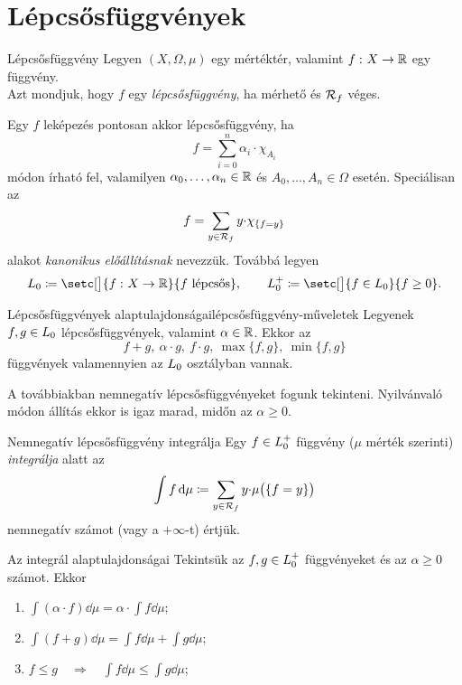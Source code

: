 \documentclass[
]{elteikthesis}[2024/04/26]
\begin{document}
	\newpage
	\section{Lépcsősfüggvények}
	
	\begin{definition}{Lépcsősfüggvény}{}
		Legyen \( (X, \Omega, \mu) \) egy mértéktér, 
		valamint \( f \,\colon X \to \mathbb{R} \) egy függvény.\\[3pt]
		Azt mondjuk, hogy \( f \) egy \emph{lépcsősfüggvény}, 
		ha mérhető és \( \mathcal{R}_{f} \) véges.
	\end{definition}
	
	Egy \( f \) leképezés pontosan akkor lépcsősfüggvény, ha
	\[
		f = \sum_{i=0}^{n} \alpha_i {\cdot} \chi_{A_i}
	\]
	módon írható fel, 
	valamilyen \( \alpha_0, \dots, \alpha_n \in \mathbb{R} \) 
	és \( A_0, \dots, A_n \in \Omega \) esetén.
	Speciálisan az
	\[
		f = \sum_{y \in \mathcal{R}_{f}} y {\cdot} \chi_{\{ f = y \}}
	\]
	alakot \emph{kanonikus előállításnak} nevezzük. Továbbá legyen
	\[
		\StepFunc \coloneq \setc[\big]{ \func{f}{X}{\R} }{ f \text{ lépcsős}}, \qquad
		\StepFuncPlus \coloneq \setc[\big]{ f \in \StepFunc }{ f \geq 0 }. 
	\]
	
	\begin{statement}{Lépcsősfüggvények alaptulajdonságai}{lépcsősfüggvény-műveletek}
		Legyenek \( f,g \in \StepFunc \) lépcsősfüggvények, valamint \( \alpha \in \mathbb{R} \). Ekkor az
		\[
			f + g, \ \alpha \cdot g, \ f \cdot g, \ \max\{ f, g \}, \ \min\{ f, g \}
		\]
		függvények valamennyien az \( \StepFunc \) osztályban vannak.
	\end{statement}
	
	\noindent 
	A továbbiakban nemnegatív lépcsősfüggvényeket fogunk tekinteni.
	Nyilvánvaló módon  állítás ekkor is igaz marad, 
	midőn az \( \alpha \geq 0 \).
	
	\begin{definition}{Nemnegatív lépcsősfüggvény integrálja}{}
		Egy \( f \in \StepFuncPlus \) függvény (\( \mu \) mérték szerinti) \emph{integrálja} alatt az
		\[
			\int f \mathop{}\!\mathrm{d}{\mu} \coloneq
			\sum_{y \in \mathcal{R}_{f}} y {\cdot} \mu \bigl( \{ f = y \} \bigr)
		\]
		nemnegatív számot (vagy a \( +\infty \)-t) értjük.
	\end{definition}
	
	\begin{theorem}{Az integrál alaptulajdonságai}{}
		Tekintsük az \( f, g \in \StepFuncPlus \) függvényeket és az \( \alpha \geq 0 \) számot. Ekkor
		\begin{enumerate}
			\item \( \displaystyle \int (\alpha \cdot f) \dd{\mu} = \alpha \cdot \int f \dd{\mu} \);
			\item \( \displaystyle \int (f + g) \dd{\mu} = \int f \dd{\mu} + \int g \dd{\mu} \);
			\item \( \displaystyle f \leq g \quad \Longrightarrow \quad \int f \dd{\mu} \leq \int g \dd{\mu} \);
		\end{enumerate}
	\end{theorem}

	
\end{document}
